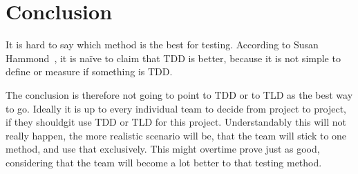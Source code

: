 \section{Conclusion}
\label{section:conclusion}
It is hard to say which method is the best for testing. 
According to Susan Hammond~\cite{sh2019}, it is naïve to claim that TDD is better,
 because it is not simple to define or measure if something is TDD.

The conclusion is therefore not going to point to TDD or to TLD as the best way to go. 
Ideally it is up to every individual team to decide from project to project, 
if they shouldgit  use TDD or TLD for this project. 
Understandably this will not really happen, 
the more realistic scenario will be, that the team will stick to one method, 
and use that exclusively. This might overtime prove just as good, 
considering that the team will become a lot better to that testing method.
